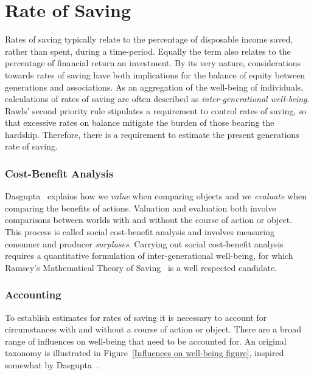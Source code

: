 \documentclass[11pt, oneside]{book}   	%
\begin{document}
\section{Rate of Saving}
Rates of saving typically relate to the percentage of disposable income saved, rather than spent, during a time-period.
Equally the term also relates to the percentage of financial return an investment.
By its very nature, considerations towards rates of saving have both implications for the balance of equity between generations and associations.
As an aggregation of the well-being of individuals, calculations of rates of saving are often described as \emph{inter-generational well-being}.
Rawls' second priority rule stipulates a requirement to control rates of saving, so that excessive rates on balance mitigate the burden of those bearing the hardship.
Therefore, there is a requirement to estimate the present generations rate of saving.

\subsubsection{Cost-Benefit Analysis}

Dasgupta~\cite{pd2} explains how we \emph{value} when comparing objects and we \emph{evaluate} when comparing the benefits of actions.
Valuation and evaluation both involve comparisons between worlds with and without the course of action or object.
This process is called social cost-benefit analysis and involves measuring consumer and producer \emph{surpluses}.
Carrying out social cost-benefit analysis requires a quantitative formulation of inter-generational well-being, for which Ramsey's Mathematical Theory of Saving~\cite{fr1} is a well respected candidate.

\subsubsection{Accounting}

To establish estimates for rates of saving it is necessary to account for circumstances with and without a course of action or object. There are a broad range of influences on well-being that need to be accounted for. An original taxonomy is illustrated in Figure~\ref{Influences on well-being figure}, inspired somewhat by Dasgupta~\cite{pd3}.
\end{document}
